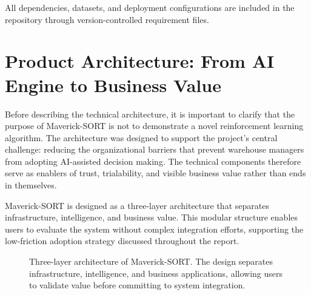All dependencies, datasets, and deployment configurations are included in the repository through version-controlled requirement files.

\clearpage

\section{Product Architecture: From AI Engine to Business Value}
\label{app:architecture}

Before describing the technical architecture, it is important to clarify that the purpose of Maverick-SORT is not to demonstrate a novel reinforcement learning algorithm. The architecture was designed to support the project's central challenge: reducing the organizational barriers that prevent warehouse managers from adopting AI-assisted decision making. The technical components therefore serve as enablers of trust, trialability, and visible business value rather than ends in themselves.

Maverick-SORT is designed as a three-layer architecture that separates infrastructure, intelligence, and business value. This modular structure enables users to evaluate the system without complex integration efforts, supporting the low-friction adoption strategy discussed throughout the report.

\begin{figure}[htbp]
\centering
{}
\caption{Three-layer architecture of Maverick-SORT. The design separates infrastructure, intelligence, and business applications, allowing users to validate value before committing to system integration.}
\label{fig:layered_arch}
\end{figure}

